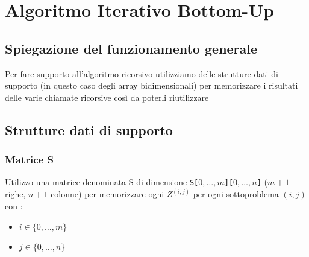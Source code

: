 \newpage
\section{Algoritmo Iterativo Bottom-Up}

\subsection{Spiegazione del funzionamento generale}
Per fare supporto all'algoritmo ricorsivo utilizziamo delle strutture dati di supporto (in questo caso degli array bidimensionali) per memorizzare i risultati delle varie chiamate ricorsive così da poterli riutilizzare

\subsection{Strutture dati di supporto}

\subsubsection{Matrice S}
Utilizzo una matrice denominata S di dimensione \texttt{S[$0, \dots, m$][$0, \dots, n$]} ($m+1$ righe, $n+1$ colonne) per memorizzare ogni $Z^{(i,j)}$ per ogni sottoproblema $(i,j)$ con :
\begin{itemize}
    \item $i \in \{0, \dots, m\}$
    \item $j \in \{0, \dots, n\}$
\end{itemize}

